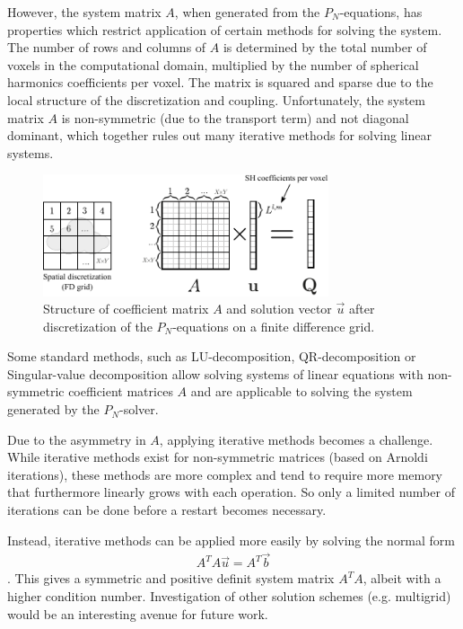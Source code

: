However, the system matrix $A$, when generated from the $P_N$-equations, has properties which restrict application of certain methods for solving the system. The number of rows and columns of $A$ is determined by the total number of voxels in the computational domain, multiplied by the number of spherical harmonics coefficients per voxel. The matrix is squared and sparse due to the local structure of the discretization and coupling. Unfortunately, the system matrix $A$ is non-symmetric (due to the transport term) and not diagonal dominant, which together rules out many iterative methods for solving linear systems.
\begin{figure}[h]
\centering
\includegraphics[width=0.75\textwidth]{04_pn_method/figures/fig_matrix_layout.pdf}
\caption{Structure of coefficient matrix $A$ and solution vector $\vec{u}$ after discretization of the $P_N$-equations on a finite difference grid.}
\label{fig:pn_matrix_layout}
\end{figure}

Some standard methods, such as LU-decomposition, QR-decomposition or Singular-value decomposition allow solving systems of linear equations with non-symmetric coefficient matrices $A$ and are applicable to solving the system generated by the $P_N$-solver. 

Due to the asymmetry in $A$, applying iterative methods becomes a challenge. While iterative methods exist for non-symmetric matrices (based on Arnoldi iterations), these methods are more complex and tend to require more memory that furthermore linearly grows with each operation. So only a limited number of iterations can be done before a restart becomes necessary.

Instead, iterative methods can be applied more easily by solving the normal form
\begin{align}
A^TA\vec{u} = A^T\vec{b}
\end{align}. This gives a symmetric and positive definit system matrix $A^TA$, albeit with a higher condition number. Investigation of other solution schemes (e.g. multigrid) would be an interesting avenue for future work.

